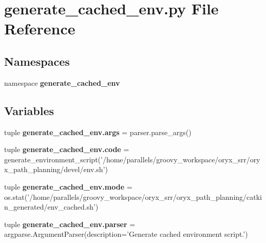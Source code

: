 \section{generate\-\_\-cached\-\_\-env.\-py \-File \-Reference}
\label{generate__cached__env_8py}
\subsection*{\-Namespaces}
\begin{DoxyCompactItemize}
\item 
namespace {\bf generate\-\_\-cached\-\_\-env}
\end{DoxyCompactItemize}
\subsection*{\-Variables}
\begin{DoxyCompactItemize}
\item 
tuple {\bf generate\-\_\-cached\-\_\-env.\-args} = parser.\-parse\-\_\-args()
\item 
tuple {\bf generate\-\_\-cached\-\_\-env.\-code} = generate\-\_\-environment\-\_\-script('/home/parallels/groovy\-\_\-workspace/oryx\-\_\-srr/oryx\-\_\-path\-\_\-planning/devel/env.\-sh')
\item 
tuple {\bf generate\-\_\-cached\-\_\-env.\-mode} = os.\-stat('/home/parallels/groovy\-\_\-workspace/oryx\-\_\-srr/oryx\-\_\-path\-\_\-planning/catkin\-\_\-generated/env\-\_\-cached.\-sh')
\item 
tuple {\bf generate\-\_\-cached\-\_\-env.\-parser} = argparse.\-Argument\-Parser(description='\-Generate cached environment script.')
\end{DoxyCompactItemize}
